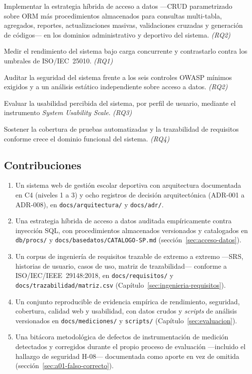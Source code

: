 \documentclass[11pt,a4paper]{article}
\newcommand{\ruta}[1]{\texttt{\footnotesize #1}}
\begin{document}
\begin{description}[leftmargin=2.4em, style=nextline]
  \item[OE1.] Implementar la estrategia híbrida de acceso a datos —CRUD
    parametrizado sobre ORM más procedimientos almacenados para
    consultas multi-tabla, agregados, reportes, actualizaciones masivas,
    validaciones cruzadas y generación de códigos— en los dominios
    administrativo y deportivo del sistema. \emph{(RQ2)}
  \item[OE2.] Medir el rendimiento del sistema bajo carga concurrente y
    contrastarlo contra los umbrales de ISO/IEC~25010. \emph{(RQ1)}
  \item[OE3.] Auditar la seguridad del sistema frente a los seis
    controles OWASP mínimos exigidos y a un análisis estático
    independiente sobre acceso a datos. \emph{(RQ2)}
  \item[OE4.] Evaluar la usabilidad percibida del sistema, por perfil de
    usuario, mediante el instrumento \emph{System Usability Scale}.
    \emph{(RQ3)}
  \item[OE5.] Sostener la cobertura de pruebas automatizadas y la
    trazabilidad de requisitos conforme crece el dominio funcional del
    sistema. \emph{(RQ4)}
\end{description}

\subsection{Contribuciones}
\label{sec:contribuciones}

\begin{enumerate}[leftmargin=*]
  \item Un sistema web de gestión escolar deportiva con arquitectura
    documentada en C4 (niveles 1 a 3) y ocho registros de decisión
    arquitectónica (ADR-001 a ADR-008), en \ruta{docs/arquitectura/} y
    \ruta{docs/adr/}.
  \item Una estrategia híbrida de acceso a datos auditada empíricamente
    contra inyección SQL, con procedimientos almacenados versionados y
    catalogados en \ruta{db/procs/} y \ruta{docs/basedatos/CATALOGO-SP.md}
    (sección~\ref{sec:acceso-datos}).
  \item Un corpus de ingeniería de requisitos trazable de extremo a
    extremo —SRS, historias de usuario, casos de uso, matriz de
    trazabilidad— conforme a ISO/IEC/IEEE~29148:2018, en
    \ruta{docs/requisitos/} y \ruta{docs/trazabilidad/matriz.csv}
    (Capítulo~\ref{sec:ingenieria-requisitos}).
  \item Un conjunto reproducible de evidencia empírica de rendimiento,
    seguridad, cobertura, calidad web y usabilidad, con datos crudos y
    \emph{scripts} de análisis versionados en \ruta{docs/mediciones/} y
    \ruta{scripts/} (Capítulo~\ref{sec:evaluacion}).
  \item Una bitácora metodológica de defectos de instrumentación de
    medición detectados y corregidos durante el propio proceso de
    evaluación —incluido el hallazgo de seguridad H-08— documentada como
    aporte en vez de omitida (sección~\ref{sec:a01-falso-correcto}).
\end{enumerate}
\end{document}
